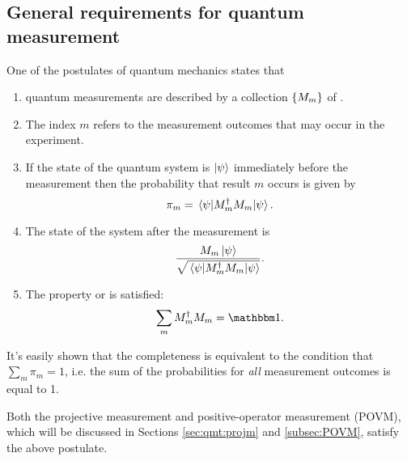 \subsection{General requirements for quantum measurement}

One of the postulates of quantum mechanics \parencite[Sec. 2.2.3]{NielsenChuang}
states that
\begin{enumerate}
  \item
    quantum measurements are described by a collection
    $\left\{M_m\right\}$ of .
  \item
    The index $m$ refers to the measurement outcomes that
    may occur in the experiment.
  \item
    If the state of the quantum system is $\ket{\psi}$
    immediately before the measurement then the probability that result $m$ occurs is
    given by
    \begin{equation}
      \pi_{m} = \ev{M^{\dagger}_{m} M_{m}}{\psi} \text{.}
    \end{equation}
  \item
    The state of the system after the measurement is
    \begin{equation}
      \frac{ M_m \ket{\psi} }{ \sqrt{\ev{M^{\dagger}_{m} M_{m}}{\psi}} } \text{.}
    \end{equation}
  \item
    The  property or  is satisfied:
    \begin{equation}
      \sum_m M_m^{\dagger} M_m = \idop \text{.}
    \end{equation}
\end{enumerate}

It's easily shown that the completeness is equivalent to the condition that
$\sum_m \pi_m = 1$, i.e. the sum of the probabilities for \emph{all} measurement outcomes is equal to 1.

Both the projective measurement and positive-operator measurement (POVM),
which will be discussed in Sections \ref{sec:qmt:projm} and \ref{subsec:POVM},
satisfy the above postulate.